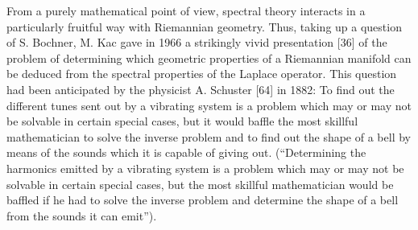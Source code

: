 From a purely mathematical point of view, spectral theory interacts in a particularly fruitful way with Riemannian geometry. Thus, taking up a question of S. Bochner, M. Kac gave in 1966 a strikingly vivid presentation {[}36{]} of the problem of determining which geometric properties of a Riemannian manifold can be deduced from the spectral properties of the Laplace operator. This question had been anticipated by the physicist A. Schuster {[}64{]} in 1882: To find out the different tunes sent out by a vibrating system is a problem which may or may not be solvable in certain special cases, but it would baffle the most skillful mathematician to solve the inverse problem and to find out the shape of a bell by means of the sounds which it is capable of giving out. (“Determining the harmonics emitted by a vibrating system is a problem which may or may not be solvable in certain special cases, but the most skillful mathematician would be baffled if he had to solve the inverse problem and determine the shape of a bell from the sounds it can emit”).

